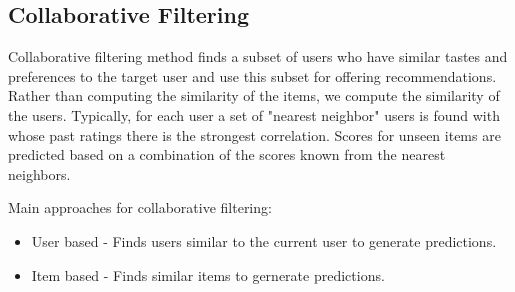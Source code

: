 \subsection{Collaborative Filtering}
 Collaborative filtering method finds a subset of users who have similar tastes and preferences to the target user and use this subset for offering recommendations. Rather than computing the similarity of the items, we compute the similarity of the users. Typically, for each user a set of "nearest neighbor" users is found with whose past ratings there is the strongest correlation. Scores for unseen items are predicted based on a combination of the scores known from the nearest neighbors.

Main approaches for collaborative filtering:
\begin{itemize}
\item User based - Finds users similar to the current user to generate predictions.
\end{itemize}
\begin{itemize}
\item Item based - Finds similar items to gernerate predictions.
\end{itemize}


